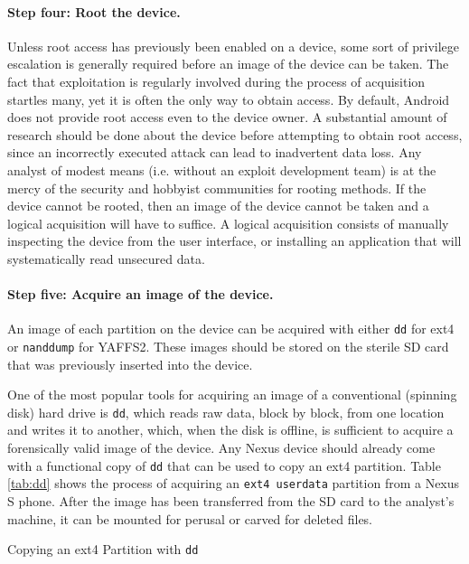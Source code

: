 \paragraph{Step four: Root the device.}
Unless root access has previously been enabled on a device, some sort of privilege escalation is generally required before an image
of the device can be taken. The fact that exploitation is regularly involved during the process of acquisition startles many, yet it
is often the only way to obtain access. By default, Android does not provide root access even to the device owner.  A substantial
amount of research should be done about the device before attempting to obtain root access, since an incorrectly executed attack can
lead to inadvertent data loss. Any analyst of modest means (i.e. without an exploit development team) is at the mercy of the
security and hobbyist communities for rooting methods. If the device cannot be rooted, then an image of the device cannot be taken
and a logical acquisition will have to suffice. A logical acquisition consists of manually inspecting the device from the user
interface, or installing an application that will systematically read unsecured data.

\paragraph{Step five: Acquire an image of the device.} An image of each partition on the device can be acquired with either
\texttt{dd} for ext4 or \texttt{nanddump} for YAFFS2.  These images should be stored on the sterile SD card that was previously
inserted into the device.  

One of the most popular tools for acquiring an image of a conventional (spinning disk) hard drive is
\texttt{dd}, which reads raw data, block by block, from one location and writes it to another, which, when the disk is offline, is
sufficient to acquire a forensically valid image of the device.  Any Nexus device should already come with a functional copy of
\texttt{dd} that can be used to copy an ext4 partition.  Table \ref{tab:dd} shows the process of acquiring an \texttt{ext4 userdata}
partition from a Nexus S phone.  After the image has been transferred from the SD card to the analyst's machine, it can be mounted
for perusal or carved for deleted files.  

\begin{table}[htb]
\lstset{numbers=none}

\caption{Copying an ext4 Partition with \texttt{dd}}
\label{tab:dd}
\end{table}

